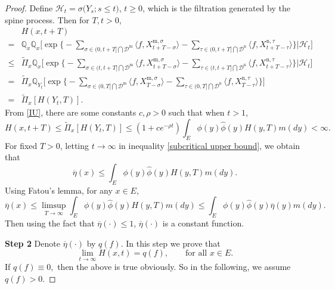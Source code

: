\documentclass[12pt,a4paper]{amsart}
\numberwithin{equation}{section}
\theoremstyle{plain}
\theoremstyle{definition}
\theoremstyle{remark}
\begin{document}
\begin{proof}
Define  $\mathcal{H}_t=\sigma\big(Y_s; s\leq t\big)$, $t\geq 0$, which is  the filtration generated by the spine process.  Then for $T,t>0$,
\begin{equation}\label{subcritical upper bound}
 \begin{aligned}
 &H(x,t+T)\\
 =&\mathbb Q_{x}\mathbb Q_{x}\Big[\exp\Big\{-\sum_{\sigma\in (0, t+T]\bigcap \mathcal D^{\mathrm m}}\langle f, X_{t+T-\sigma}^{{\mathrm m},\sigma}\rangle -\sum_{\tau\in (0, t+T]\bigcap \mathcal D^{\mathrm n}}\langle f, X_{t+T-\tau}^{{\mathrm n}, \tau}\rangle \Big\}\Big| \mathcal H_t\Big]\\
 \leq&\widetilde\Pi_x\mathbb Q_{x}\Big[\exp\Big\{-\sum_{\sigma\in (t, t+T]\bigcap \mathcal D^{\mathrm m}}\langle f, X_{t+T-\sigma}^{{\mathrm m},\sigma}\rangle -\sum_{\tau\in (t, t+T]\bigcap \mathcal D^{\mathrm n}}\langle f, X_{t+T-\tau}^{{\mathrm n}, \tau}\rangle \Big\}\Big| \mathcal H_t\Big]\\
 =&
   \widetilde\Pi_x\mathbb Q_{Y_t}\Big[\exp\Big\{-\sum_{\sigma\in (0, T]\bigcap \mathcal D^{\mathrm m}}\langle f, X_{T-\sigma}^{{\mathrm m},\sigma}\rangle -\sum_{\tau\in (0, T]\bigcap \mathcal D^{\mathrm n}}\langle f, X_{T-\tau}^{{\mathrm n}, \tau}\rangle \Big\}\Big]\\
 =&\widetilde\Pi_x\left[ H(Y_t, T)\right].
 \end{aligned}
 \end{equation}
 From \eqref{IU}, there are some constants $c,\rho>0$ such that when $t>1$,
\[
 H(x,t+T)\leq \widetilde\Pi_x\left[ H(Y_t, T)\right]
\leq (1+ce^{-\rho t})\int_E\phi(y)\widehat\phi(y)H(y,T)m(dy)<\infty.
 \]
For fixed  $T>0$, letting $t\to \infty$ in inequality \eqref{subcritical upper bound}, we obtain that
\begin{equation}\label{sub super}
\overline\eta(x)\leq \int_E\phi(y)\widehat \phi(y)H(y,T)m(dy).
\end{equation}
   Using Fatou's lemma, for any $x\in E$,
\begin{equation}\label{sup inequality}
\overline\eta(x)\leq
\limsup_{T\rightarrow\infty}\int_E\phi(y)\widehat \phi(y)H(y,T)m(dy)
\leq \int_E\phi(y)\widehat\phi(y)\overline{\eta}(y)m(dy).
\end{equation}
Then using the fact that  $\overline{\eta}(\cdot)\leq 1$, $\overline\eta(\cdot)$ is a constant function.

{\bf Step 2}\quad
 Denote $\overline\eta(\cdot)$ by $q(f)$.  In this step we prove that
 \begin{equation}\label{limit-H}
 \lim_{t\rightarrow\infty}H(x,t)=q(f),\qquad \mbox{for all}\,\, x\in E.
 \end{equation}
If $q(f)\equiv 0,$ then the above is true obviously. So in the
following, we assume $q(f)>0$.


\end{proof}
\end{document}
